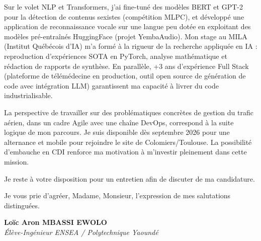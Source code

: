 \documentclass[a4paper,11pt]{article}
\begin{document}
Sur le volet NLP et Transformers, j'ai fine-tuné des modèles BERT et GPT-2 pour la détection de contenus sexistes (compétition MLPC), et développé une application de reconnaissance vocale sur une langue peu dotée en exploitant des modèles pré-entraînés HuggingFace (projet YembaAudio). Mon stage au MILA (Institut Québécois d'IA) m'a formé à la rigueur de la recherche appliquée en IA : reproduction d'expériences SOTA en PyTorch, analyse mathématique et rédaction de rapports de synthèse. En parallèle, +3 ans d'expérience Full Stack (plateforme de télémédecine en production, outil open source de génération de code avec intégration LLM) garantissent ma capacité à livrer du code industrialisable.

La perspective de travailler sur des problématiques concrètes de gestion du trafic aérien, dans un cadre Agile avec une chaîne DevOps, correspond à la suite logique de mon parcours. Je suis disponible dès septembre 2026 pour une alternance et mobile pour rejoindre le site de Colomiers/Toulouse. La possibilité d'embauche en CDI renforce ma motivation à m'investir pleinement dans cette mission.

Je reste à votre disposition pour un entretien afin de discuter de ma candidature.

Je vous prie d'agréer, Madame, Monsieur, l'expression de mes salutations distinguées.

\vspace{0.8cm}

\textbf{Loïc Aron MBASSI EWOLO}\\
\textit{Élève-Ingénieur ENSEA / Polytechnique Yaoundé}
\end{document}
